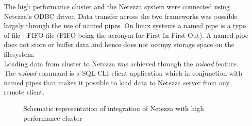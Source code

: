 \documentclass{acm_proc_article-sp}
\begin{document}
The high performance cluster and the Netezza system were connected using Netezza's
ODBC driver. Data transfer across the two frameworks was possible largely through the use of named pipes. On linux systems a
named pipe is a type of file - FIFO file (FIFO being the acronym for First In First Out). A named pipe does not store or buffer data and
hence does not occupy storage space on the filesystem.\\
Loading data from cluster to Netezza was achieved through the \textit{nzload} feature. The \textit{nzload} command is a SQL CLI client
application which in conjunction with named pipes that makes it possible to load data 
to Netezza server from any remote client\cite{data_load}. 

\begin{figure}
\begin{center}
\caption{\label{fig2} Schematic representation of integration of Netezza with high performance cluster}%
\end{center}
\end{figure}
\end{document}
